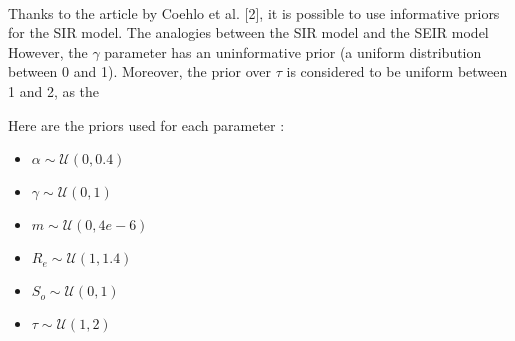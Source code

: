 \documentclass[11pt, a4paper]{article}
\begin{document}
\paragraph{}
Thanks to the article by Coehlo et al. [2], it is possible to use informative priors for the SIR model. The analogies between the SIR model and the SEIR model  However, the $\gamma$ parameter has an uninformative prior (a uniform distribution between 0 and 1). Moreover, the prior over $\tau$ is considered to be uniform between 1 and 2, as the 

Here are the priors used for each parameter : 
\begin{itemize}
\item $\alpha \sim \mathcal{U}(0, 0.4)$ 
\item $\gamma \sim \mathcal{U}(0, 1)$
\item $m \sim  \mathcal{U}(0, 4e-6)$
\item $R_e \sim \mathcal{U}(1, 1.4)$
\item $S_o \sim \mathcal{U}(0, 1)$
\item $ \tau \sim \mathcal{U}(1, 2)$
\end{itemize}
\end{document}
